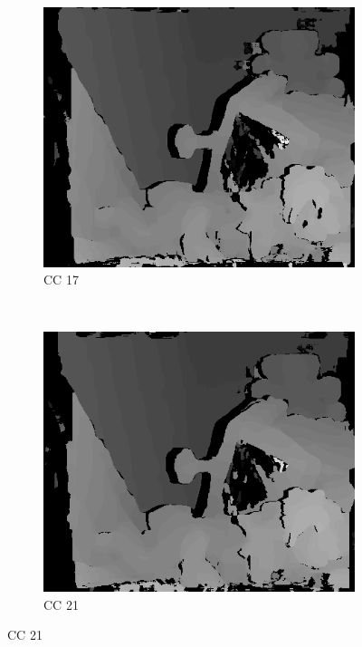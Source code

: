 \begin{figure}
\begin{subfigure}[b]{0.23\textwidth}
    \centering
    \includegraphics[width=\textwidth]{images/stereo-pairs/teddy_dual_crosschecked_17.png}
    \caption{CC 17}
  \end{subfigure}
  ~
  \begin{subfigure}[b]{0.23\textwidth}
    \centering
    \includegraphics[width=\textwidth]{images/stereo-pairs/teddy_dual_crosschecked_21.png}
    \caption{CC 21}
  \end{subfigure}


\end{figure}
